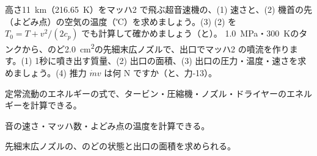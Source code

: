 \bkproblem 高さ\qty{11}{km}（\qty{216.65}{K}）をマッハ2 で飛ぶ超音速機の、(1) 速さと、(2) 機首の先（よどみ点）の空気の温度（℃）を求めましょう。(3) (2) を $T_0=T+v^2/(2c_p)$ でも計算して確かめましょう（と）。
\bkproblem \qty{1.0}{MPa}・\qty{300}{K}のタンクから、のど\qty{2.0}{cm^2}の先細末広ノズルで、出口でマッハ2 の噴流を作ります。(1) 1秒に噴き出す質量、(2) 出口の面積、(3) 出口の圧力・温度・速さを求めましょう。(4) 推力 $\dot mv$ は何 N ですか（と、力-13）。

\begin{furikaeri}
\begin{checklist}
\item 定常流動のエネルギーの式で、タービン・圧縮機・ノズル・ドライヤーのエネルギーを計算できる。
\item 音の速さ・マッハ数・よどみ点の温度を計算できる。
\item 先細末広ノズルの、のどの状態と出口の面積を求められる。
\end{checklist}
\end{furikaeri}
